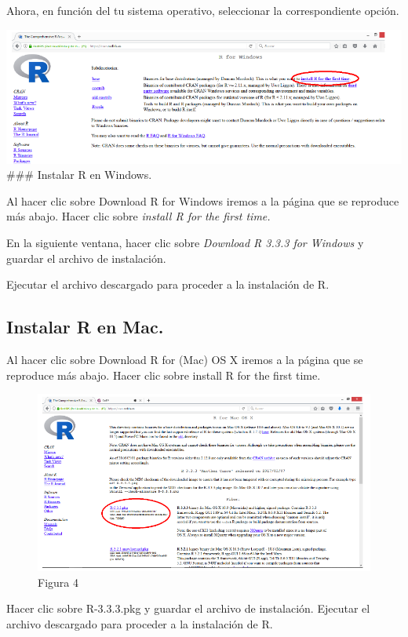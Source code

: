 \documentclass[
]{book}
\begin{document}
Ahora, en función del tu sistema operativo, seleccionar la correspondiente opción.

\includegraphics{imagenes/03.png}
\#\#\# Instalar R en Windows.

Al hacer clic sobre Download R for Windows iremos a la página que se reproduce más abajo. Hacer clic sobre \emph{install R for the first time.}

En la siguiente ventana, hacer clic sobre \emph{Download R 3.3.3 for Windows} y guardar el archivo de instalación.

Ejecutar el archivo descargado para proceder a la instalación de R.

\hypertarget{instalar-r-en-mac.}{%
\subsection{Instalar R en Mac.}\label{instalar-r-en-mac.}}

Al hacer clic sobre Download R for (Mac) OS X iremos a la página que se reproduce más abajo. Hacer clic sobre install R for the first time.

\begin{figure}
\centering
\includegraphics{imagenes/04.png}
\caption{Figura 4}
\end{figure}

Hacer clic sobre R-3.3.3.pkg y guardar el archivo de instalación. Ejecutar el archivo descargado para proceder a la instalación de R.
\end{document}
